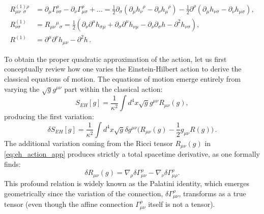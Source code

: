 \begin{equation} \label{eq:linearized_curvatures}
    \begin{aligned}
        R^{(1)\rho}_{\mu\nu\phantom{\rho}\sigma} & = \partial_\mu \Gamma^\rho_{\nu\sigma} - \partial_\nu \Gamma^\rho_{\mu\sigma} + \dots = \frac{1}{2}\partial_\sigma(\partial_\mu h_\nu^{\phantom{\nu}\rho} - \partial_\nu h_\mu^{\phantom{\mu}\rho}) - \frac{1}{2}\partial^\rho(\partial_\mu h_{\nu\sigma} - \partial_\nu h_{\mu\sigma}), \\
        R^{(1)}_{\nu\sigma}                      & = R_{\mu\nu}{}^\mu{}_\sigma = \frac{1}{2}(\partial_\nu\partial^\mu h_{\sigma\mu} + \partial_\sigma\partial^\mu h_{\nu\mu} - \partial_\nu\partial_\sigma h - \partial^2 h_{\nu\sigma}),                                                                                                   \\
        R^{(1)}                                  & = \partial^\mu\partial^\nu h_{\mu\nu} - \partial^2 h \, .
    \end{aligned}
\end{equation}

To obtain the proper quadratic approximation of the action, let us first conceptually review how one varies the Einstein-Hilbert action to derive the classical equations of motion. The equations of motion emerge entirely from varying the \(\sqrt{g}g^{\mu\nu}\) part within the classical action:
\begin{equation} \label{eq:eh_action_app}
    S_{EH}[g] = \frac{1}{\kappa^2} \int d^4x \sqrt{g} g^{\mu\nu} R_{\mu\nu}(g),
\end{equation}
producing the first variation:
\[
    \delta S_{EH}[g] = \frac{1}{\kappa^2} \int d^4x \sqrt{g} \delta g^{\mu\nu} \Big( R_{\mu\nu}(g) - \frac{1}{2} g_{\mu\nu} R(g) \Big) \, .
\]
The additional variation coming from the Ricci tensor \(R_{\mu\nu}(g)\) in \eqref{eq:eh_action_app} produces strictly a total spacetime derivative, as one formally finds:
\begin{equation} \label{eq:palatini_identity}
    \delta R_{\mu\nu}(g) = \nabla_\rho \delta \Gamma^\rho_{\mu\nu} - \nabla_\nu \delta \Gamma^\rho_{\mu\rho}.
\end{equation}
This profound relation is widely known as the Palatini identity, which emerges geometrically since the variation of the connection, \(\delta \Gamma^\rho_{\mu\nu}\), transforms as a true tensor (even though the affine connection \(\Gamma^\rho_{\mu\nu}\) itself is not a tensor).

